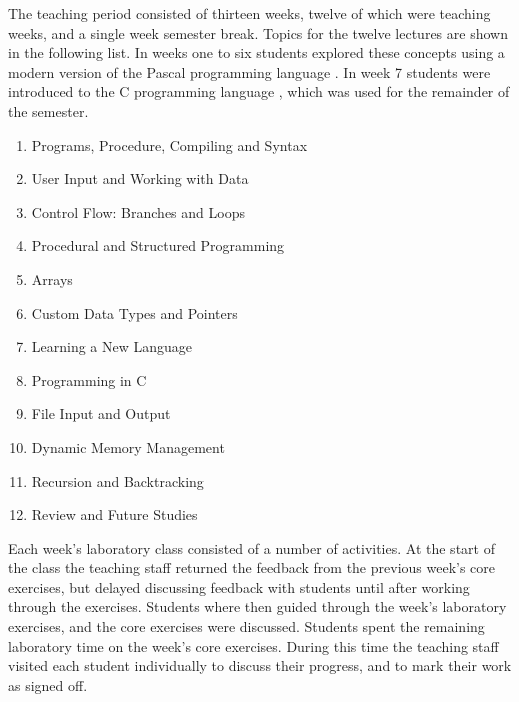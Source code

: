 The teaching period consisted of thirteen weeks, twelve of which were teaching weeks, and a single week semester break. Topics for the twelve lectures are shown in the following list. In weeks one to six students explored these concepts using a modern version of the Pascal programming language \cite{Wirth:1971,FPC:2011}. In week 7 students were introduced to the C programming language \cite{Ritchie:1978}, which was used for the remainder of the semester. 

\begin{enumerate}
  \item Programs, Procedure, Compiling and Syntax
  \item User Input and Working with Data
  \item Control Flow: Branches and Loops
  \item Procedural and Structured Programming
  \item Arrays
  \item Custom Data Types and Pointers
  \item Learning a New Language
  \item Programming in C
  \item File Input and Output
  \item Dynamic Memory Management
  \item Recursion and Backtracking
  \item Review and Future Studies
\end{enumerate}

Each week's laboratory class consisted of a number of activities. At the start of the class the teaching staff returned the feedback from the previous week's core exercises, but delayed discussing feedback with students until after working through the exercises. Students where then guided through the week's laboratory exercises, and the core exercises were discussed. Students spent the remaining laboratory time on the week's core exercises. During this time the teaching staff visited each student individually to discuss their progress, and to mark their work as signed off.

